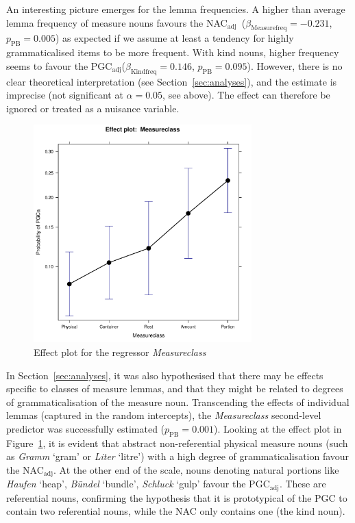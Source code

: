 \documentclass[USenglish]{article}
\newcommand{\Sub}[1]{\ensuremath{\mathrm{_{#1}}}}
\newcommand{\mpPB}{\ensuremath{p_{\text{PB}}}}
\newcommand{\NACa}{NAC\Sub{adj}}
\newcommand{\PGCa}{PGC\Sub{adj}}
\begin{document}
An interesting picture emerges for the lemma frequencies.
A higher than average lemma frequency of measure nouns favours the \NACa\ ($\beta_{\text{Measurefreq}}=-0.231$, $\mpPB=0.005$) as expected if we assume at least a tendency for highly grammaticalised items to be more frequent.
With kind nouns, higher frequency seems to favour the \PGCa ($\beta_{\text{Kindfreq}}=0.146$, $\mpPB=0.095$).
However, there is no clear theoretical interpretation (see Section~\ref{sec:analyses}), and the estimate is imprecise (not significant at $\alpha=0.05$, see above).
The effect can therefore be ignored or treated as a nuisance variable.



\begin{figure}[h!]
  \centering
  \includegraphics[width=0.75\textwidth]{../R/output/corpus_Measureclass}
  \caption{Effect plot for the regressor \textit{Measureclass}}
  \label{fig:eff:measureattraction}
\end{figure}

In Section~\ref{sec:analyses}, it was also hypothesised that there may be effects specific to classes of measure lemmas, and that they might be related to degrees of grammaticalisation of the measure noun.
Transcending the effects of individual lemmas (captured in the random intercepts), the \textit{Measureclass} second-level predictor was successfully estimated ($\mpPB=0.001$).
Looking at the effect plot in Figure~\ref{fig:eff:measureattraction}, it is evident that abstract non-referential physical measure nouns (such as \textit{Gramm} `gram' or \textit{Liter} `litre') with a high degree of grammaticalisation favour the \NACa.
At the other end of the scale, nouns denoting natural portions like \textit{Haufen} `heap', \textit{Bündel} `bundle', \textit{Schluck} `gulp' favour the \PGCa.
These are referential nouns, confirming the hypothesis that it is prototypical of the PGC to contain two referential nouns, while the NAC only contains one (the kind noun).
\end{document}
